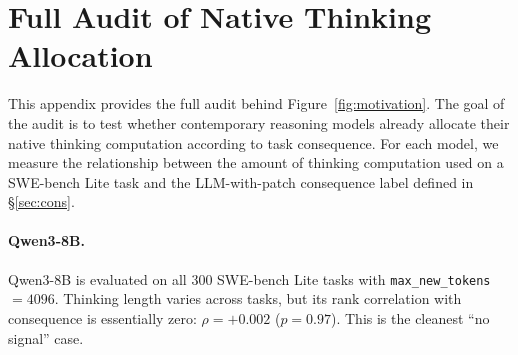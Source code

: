 \documentclass{article}
\begin{document}
\appendix

\section{Full Audit of Native Thinking Allocation}
\label{app:audit}

This appendix provides the full audit behind Figure~\ref{fig:motivation}.
The goal of the audit is to test whether contemporary reasoning models
already allocate their native thinking computation according to task
consequence. For each model, we measure the relationship between the
amount of thinking computation used on a SWE-bench Lite task and the
LLM-with-patch consequence label defined in \S\ref{sec:cons}.

\begin{table}[h]
\centering
{}
\caption{\textbf{Native thinking allocation audit on SWE-bench Lite.}
We report sample size, configured token budget, Spearman correlation
between thinking length and consequence, and the observed failure mode.
The audited models exhibit no consequence signal, saturation, or weak
adaptation.}
\label{tab:audit-app}
\end{table}

\paragraph{Qwen3-8B.}
Qwen3-8B is evaluated on all $300$ SWE-bench Lite tasks with
\texttt{max\_new\_tokens}$=4096$. Thinking length varies across tasks,
but its rank correlation with consequence is essentially zero:
$\rho=+0.002$ ($p=0.97$). This is the cleanest ``no signal'' case.
\end{document}
